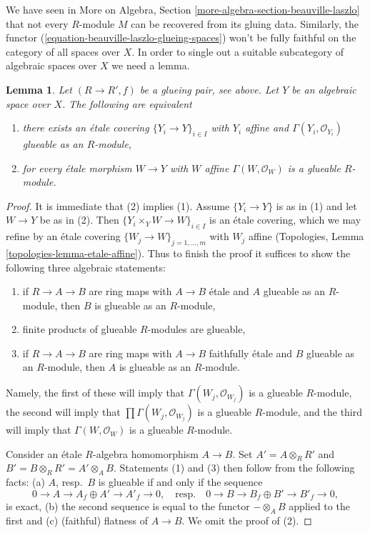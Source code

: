 \documentclass{stacks-project}
\theoremstyle{plain}
\newtheorem{lemma}[subsection]{Lemma}
\theoremstyle{definition}
\theoremstyle{remark}
\numberwithin{equation}{subsection}
\begin{document}
\medskip\noindent
We have seen in
More on Algebra, Section \ref{more-algebra-section-beauville-laszlo}
that not every $R$-module $M$ can be recovered from its
gluing data. Similarly, the functor
(\ref{equation-beauville-laszlo-glueing-spaces})
won't be fully faithful on the category of all spaces over $X$.
In order to single out a suitable subcategory of algebraic
spaces over $X$ we need a lemma.

\begin{lemma}
\label{lemma-glueable}
Let $(R \to R', f)$ be a glueing pair, see above. Let $Y$ be an algebraic
space over $X$. The following are equivalent
\begin{enumerate}
\item there exists an \'etale covering $\{Y_i \to Y\}_{i \in I}$
with $Y_i$ affine and $\Gamma(Y_i, \mathcal{O}_{Y_i})$
glueable as an $R$-module,
\item for every \'etale morphism $W \to Y$ with $W$ affine
$\Gamma(W, \mathcal{O}_W)$ is a glueable $R$-module.
\end{enumerate}
\end{lemma}

\begin{proof}
It is immediate that (2) implies (1). Assume $\{Y_i \to Y\}$
is as in (1) and let $W \to Y$ be as in (2). Then
$\{Y_i \times_Y W \to W\}_{i \in I}$ is an \'etale covering,
which we may refine by an \'etale covering
$\{W_j \to W\}_{j = 1, \ldots, m}$ with $W_j$ affine
(Topologies, Lemma \ref{topologies-lemma-etale-affine}).
Thus to finish the proof it suffices to show
the following three algebraic statements:
\begin{enumerate}
\item if $R \to A \to B$ are ring maps with $A \to B$ \'etale
and $A$ glueable as an $R$-module, then $B$ is glueable as an
$R$-module,
\item finite products of glueable $R$-modules are glueable,
\item if $R \to A \to B$ are ring maps with $A \to B$ faithfully \'etale
and $B$ glueable as an $R$-module, then $A$ is glueable as an
$R$-module.
\end{enumerate}
Namely, the first of these will imply that $\Gamma(W_j, \mathcal{O}_{W_j})$
is a glueable $R$-module, the second will imply that
$\prod \Gamma(W_j, \mathcal{O}_{W_j})$ is a glueable $R$-module, and
the third will imply that $\Gamma(W, \mathcal{O}_W)$ is a glueable
$R$-module.

\medskip\noindent
Consider an \'etale $R$-algebra homomorphism $A \to B$. Set
$A' = A \otimes_R R'$ and $B' = B \otimes_R R' = A' \otimes_A B$.
Statements (1) and (3) then follow from the following facts:
(a) $A$, resp.\ $B$ is glueable if and only if the sequence
$$
0 \to A \to A_f \oplus A' \to A'_f \to 0,
\quad\text{resp.}\quad
0 \to B \to B_f \oplus B' \to B'_f \to 0,
$$
is exact, (b) the second sequence is equal to
the functor $- \otimes_A B$ applied to the first and
(c) (faithful) flatness of $A \to B$. We omit the proof of (2).
\end{proof}
\end{document}
